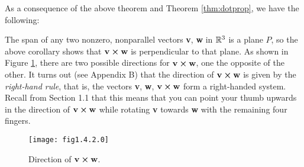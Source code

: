 As a consequence of the above theorem and Theorem \ref{thm:dotprop}, we have the following:


The span of any two nonzero, nonparallel vectors \textbf{v}, \textbf{w} in $\mathbb{R}^{3}$ is a plane $P$, so the above
corollary shows that $\textbf{v} \bm{\times} \textbf{w}$ is perpendicular to that plane. As shown in
Figure \ref{fig:crossnormal}, there are two possible directions for $\textbf{v} \bm{\times} \textbf{w}$, one the
opposite of the other.
It turns out (see Appendix B) that the direction of $\textbf{v} \bm{\times} \textbf{w}$
is given by the \emph{right-hand rule}, that is, the vectors \textbf{v}, \textbf{w},
$\textbf{v} \bm{\times} \textbf{w}$ form a right-handed system. Recall from Section 1.1 that this means that
you can point your thumb upwards in the direction of $\textbf{v} \bm{\times} \textbf{w}$
while rotating \textbf{v} towards \textbf{w} with the remaining four fingers.

\begin{figure}[h]
 \begin{center}
  \texttt{[image: fig1.4.2.0]}\vspace{-5mm}
 \end{center}
 \caption[]{\quad Direction of $\textbf{v} \bm{\times} \textbf{w}$.}
 \label{fig:crossnormal}
\end{figure}

